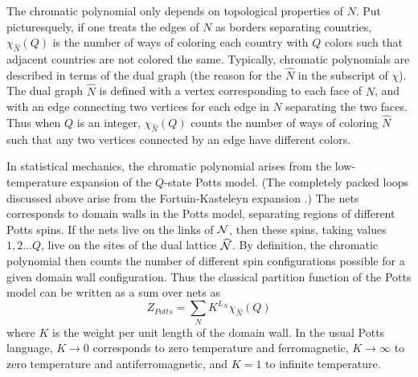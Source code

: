 \documentclass[11pt]{article}
\newcommand{\Nhat}{\widehat{\cal N}}
\begin{document}
The chromatic polynomial only depends on topological properties of
$N$.  Put picturesquely, if
one treats the edges of $N$ as borders separating countries,
$\chi_{\widehat{N}}(Q)$ is the number of ways of coloring each
country with $Q$ colors such that adjacent countries are not colored
the same. Typically, chromatic polynomials are described in terms of
the dual graph (the reason for the $\widehat{N}$ in the subscript of
$\chi$). The dual graph $\widehat{N}$ is defined with a vertex corresponding
to each face of $N$, and with an edge connecting two vertices for each
edge in $N$ separating the two faces. Thus when $Q$ is an
integer, $\chi_{\widehat{N}}(Q)$ counts the number of ways of
coloring $\widehat{N}$ such that any two vertices connected by an edge
have different colors. 

In statistical mechanics, the chromatic polynomial arises from the
{low}-temperature expansion of the $Q$-state Potts model. (The
completely packed loops discussed above arise from the Fortuin-Kasteleyn
expansion \cite{FK}.) The nets corresponds to domain
walls in the Potts model, separating regions of different Potts
spins. If the nets live on the links of ${\cal N}$, then these spins,
taking values $1,2\dots Q$, live on the sites of the dual lattice $
\Nhat$.  By definition, the chromatic polynomial then counts the number
of different spin configurations possible for a given domain wall
configuration. Thus the classical partition function of the Potts
model can be written as a sum over nets as
\begin{equation}
Z_{Potts} = \sum_{N} K^{L_N}\chi_{\widehat{N}}(Q) 
\label{ZPotts}
\end{equation}
where $K$ is the weight per unit length of the domain wall. In the
usual Potts language, $K\to 0$ corresponds to zero temperature and
ferromagnetic, $K\to \infty$ to zero temperature and antiferromagnetic, 
and $K=1$ to infinite temperature.
\end{document}
